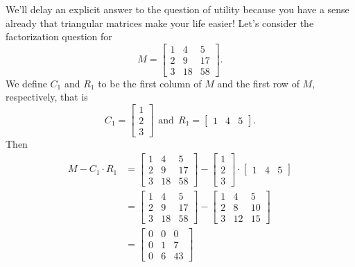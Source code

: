 We'll delay an explicit answer to the question of utility because you have a sense already that triangular matrices make your life easier! Let's consider the factorization question for
$$M=\left[\begin{array}{rrr} 
    1   &  4   &  5 \\
     2  &   9  &  17 \\
     3  &  18  &  58 \end{array}  \right]. $$
We define $C_1$  and $R_1$  to be the first column of $M$ and the first row of $M$, respectively, that is
$$C_1=\left[\begin{array}{r} 
    1  \\ 2 \\ 3  \end{array}  \right]~~\text{and}~~R_1=\left[\begin{array}{rrr} 
    1   &  4   &  5 \end{array}  \right].  $$
Then
\begin{align*} 
M - C_1 \cdot R_1 &= \left[\begin{array}{rrr} 
    1   &  4   &  5 \\
     2  &   9  &  17 \\
     3  &  18  &  58 \end{array}  \right] -  \left[\begin{array}{r} 
    1  \\ 2 \\ 3  \end{array}  \right] \cdot \left[\begin{array}{rrr} 
    1   &  4   &  5 \end{array}  \right] \\
    &=  \left[\begin{array}{rrr} 
    1   &  4   &  5 \\
     2  &   9  &  17 \\
     3  &  18  &  58 \end{array}  \right] - 
     \left[\begin{array}{rrr} 
    1   &  4   &  5 \\
     2  &   8  &  10 \\
     3  &  12  &  15 \end{array}  \right]\\
     &=\left[\begin{array}{rrr} 
       0  &   0  &   0 \\
     0   &  1   &  7 \\
     0   &  6   & 43 \end{array}  \right]
\end{align*}

